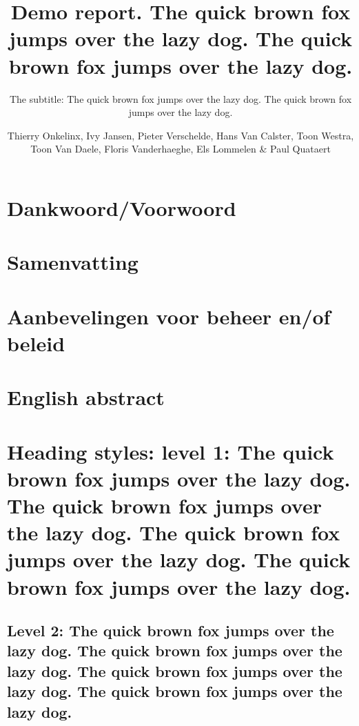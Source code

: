 \documentclass[9pt, twoside]{extreport}
\title{Demo report. The quick brown fox jumps over the lazy dog. The quick brown fox jumps over the lazy dog.}
\subtitle{The subtitle: The quick brown fox jumps over the lazy dog. The quick brown fox jumps over the lazy dog.}
\author{Thierry Onkelinx, Ivy Jansen, Pieter Verschelde, Hans Van Calster, Toon Westra, Toon Van Daele, Floris Vanderhaeghe, Els Lommelen \& Paul Quataert}
\begin{document}
\maketitle
{}

\chapter*{Dankwoord/Voorwoord}
\lipsum[23-35]

\chapter*{Samenvatting}
\lipsum[36-40]

\chapter*{Aanbevelingen voor beheer en/of beleid}
\lipsum[41-45]

\chapter*{English abstract}
\lipsum[46-50]

\setcounter{tocdepth}{6}
\tableofcontents
{}
\listoffigures
{}
\listoftables
{}

\newpage
{}

\chapter{Heading styles: level 1: The quick brown fox jumps over the lazy dog. The quick brown fox jumps over the lazy dog. The quick brown fox jumps over the lazy dog. The quick brown fox jumps over the lazy dog.}

\lipsum[1-2]

\section{Level 2: The quick brown fox jumps over the lazy dog. The quick brown fox jumps over the lazy dog. The quick brown fox jumps over the lazy dog. The quick brown fox jumps over the lazy dog.}
\end{document}
